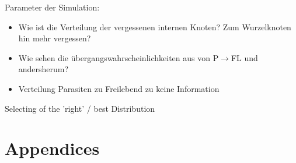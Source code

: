   Parameter der Simulation:
  \begin{itemize}
    \item Wie ist die Verteilung der vergessenen internen Knoten? Zum Wurzelknoten hin mehr vergessen?
    \item Wie sehen die übergangswahrscheinlichkeiten aus von P$\rightarrow$FL und andersherum?
    \item Verteilung Parasiten zu Freilebend zu keine Information
  \end{itemize}


  Selecting of the 'right'  / best Distribution
  



\chapter{Appendices}
